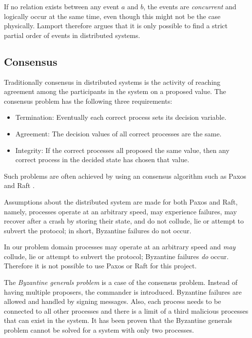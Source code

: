         \noindent If no relation exists between any event $a$ and $b$, the events are \textit{concurrent} and logically occur at the same time, even though this might not be the case physically. Lamport therefore argues that it is only possible to find a strict partial order of events in distributed systems.
		
		\subsection{Consensus}
		Traditionally consensus in distributed systems is the activity of reaching agreement among the participants in the system on a proposed value. The consensus problem has the following three requirements:
		\begin{itemize}
			\item Termination: Eventually each correct process sets its decision variable.
			\item Agreement: The decision values of all correct processes are the same.
			\item Integrity: If the correct processes all proposed the same value, then any correct process in the decided state has chosen that value.
		\end{itemize}
		
		\newpar Such problems are often achieved by using an consensus algorithm such as Paxos\cite{Lamport:1998:PP:279227.279229} and Raft \cite{Raft:Ongaro:184040}.
		
		Assumptions about the distributed system are made for both Paxos and Raft, namely, processes operate at an arbitrary speed, may experience failures, may recover after a crash by storing their state, and do not collude, lie or attempt to subvert the protocol; in short, Byzantine failures do not occur.
		
		In our problem domain processes may operate at an arbitrary speed and \textit{may} collude, lie or attempt to subvert the protocol; Byzantine failures \textit{do} occur. Therefore it is not possible to use Paxos or Raft for this project. 
		 
		\newpar The \textit{Byzantine generals problem} is a case of the consensus problem. Instead of having multiple proposers, the commander is introduced. Byzantine failures are allowed and handled by signing messages. Also, each process needs to be connected to all other processes and there is a limit of a third malicious processes that can exist in the system. It has been proven that the Byzantine generals problem cannot be solved for a system with only two processes. \cite{Lamport:1982:BGP:357172.357176}
		
